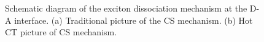 \documentclass[12pt]{article}
\begin{document}
\begin{figure}[H]
\centering
{} \hspace{5pt}
\caption{Schematic diagram of the exciton dissociation mechanism at the D-A interface. (a) Traditional picture of the CS mechanism. (b) Hot CT picture of CS mechanism.}
\label{fig:hot and cold mechanism}
\end{figure}
\end{document}
